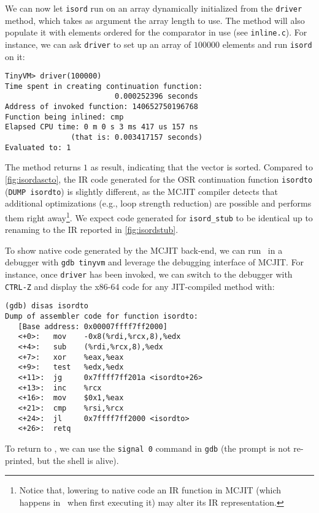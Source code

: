 \noindent We can now let {\tt isord} run on an array dynamically initialized from the {\tt driver} method, which takes as argument the array length to use. The method will also populate it with elements ordered for the comparator in use (see {\small\tt inline.c}). For instance, we can ask {\tt driver} to set up an array of $100000$ elements and run {\tt isord} on it:

\begin{small}
\begin{verbatim}
TinyVM> driver(100000)
Time spent in creating continuation function:
                         0.000252396 seconds
Address of invoked function: 140652750196768
Function being inlined: cmp
Elapsed CPU time: 0 m 0 s 3 ms 417 us 157 ns
               (that is: 0.003417157 seconds)
Evaluated to: 1
\end{verbatim}
\end{small}

\noindent The method returns $1$ as result, indicating that the vector is sorted. Compared to \myfigure\ref{fig:isordascto}, the IR code generated for the OSR continuation function {\tt isordto} ({\tt DUMP isordto}) is slightly different, as the MCJIT compiler detects that additional optimizations (e.g., loop strength reduction) are possible and performs them right away\footnote{Notice that, lowering to native code an IR function in MCJIT (which happens in \tinyvm\ when first executing it) may alter its IR representation. }. We expect code generated for {\tt isord\_stub} to be identical up to renaming to the IR reported in \myfigure\ref{fig:isordstub}.

To show native code generated by the MCJIT back-end, we can run \tinyvm\ in a debugger with {\small\tt gdb tinyvm} and leverage the debugging interface of MCJIT. For instance, once {\tt driver} has been invoked, we can switch to the debugger with {\tt CTRL-Z} and display the x86-64 code for any JIT-compiled method with:
\begin{small}
\begin{verbatim}
(gdb) disas isordto
Dump of assembler code for function isordto:
   [Base address: 0x00007ffff7ff2000]
   <+0>:   mov    -0x8(%rdi,%rcx,8),%edx
   <+4>:   sub    (%rdi,%rcx,8),%edx
   <+7>:   xor    %eax,%eax
   <+9>:   test   %edx,%edx
   <+11>:  jg     0x7ffff7ff201a <isordto+26>
   <+13>:  inc    %rcx
   <+16>:  mov    $0x1,%eax
   <+21>:  cmp    %rsi,%rcx
   <+24>:  jl     0x7ffff7ff2000 <isordto>
   <+26>:  retq
\end{verbatim}
\end{small}

\noindent To return to \tinyvm, we can use the {\tt signal 0} command in {\tt gdb} (the prompt is not re-printed, but the shell is alive).
